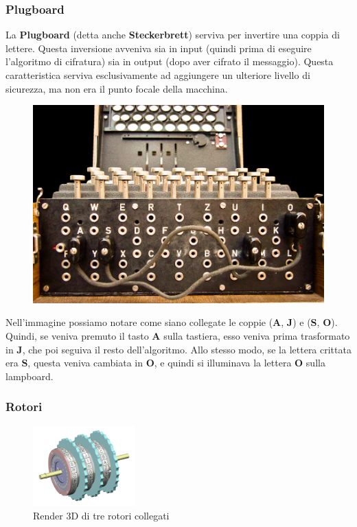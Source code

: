 \documentclass{rapport}
\begin{document}
\subsubsection{Plugboard}

La \textbf{Plugboard} (detta anche \textbf{Steckerbrett}) serviva per invertire una coppia di lettere. Questa inversione avveniva sia in input (quindi prima di eseguire l'algoritmo di cifratura) sia in output (dopo aver cifrato il messaggio). Questa caratteristica serviva esclusivamente ad aggiungere un ulteriore livello di sicurezza, ma non era il punto focale della macchina.

\begin{figure}[h]
    \centering
    \includegraphics[width=0.6\linewidth]{logos/enigma3.jpg}
\end{figure}

Nell'immagine possiamo notare come siano collegate le coppie (\textbf{A}, \textbf{J}) e (\textbf{S}, \textbf{O}).  
Quindi, se veniva premuto il tasto \textbf{A} sulla tastiera, esso veniva prima trasformato in \textbf{J}, che poi seguiva il resto dell'algoritmo.  
Allo stesso modo, se la lettera crittata era \textbf{S}, questa veniva cambiata in \textbf{O}, e quindi si illuminava la lettera \textbf{O} sulla lampboard.

\subsubsection{Rotori}

\begin{figure}
    \vspace{-1cm}
    \centering
    \includegraphics[width=0.35\textwidth]{logos/enigma5.png}
    \caption*{Render 3D di tre rotori collegati}
\end{figure}
\end{document}
